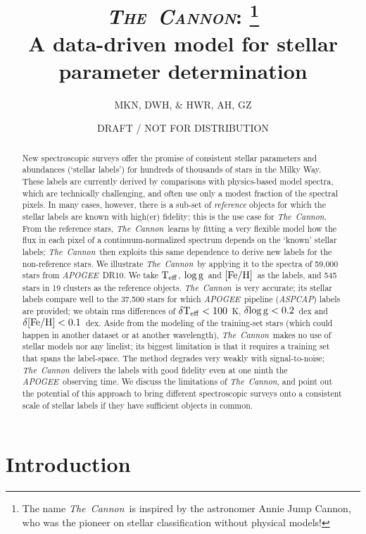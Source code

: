 \documentclass[12pt, preprint]{aastex}
\newcommand{\teff}{\mbox{$\rm T_{eff}$}}
\newcommand{\feh}{\mbox{$\rm [Fe/H]$}}
\newcommand{\logg}{\mbox{$\rm \log g$}}
\newcommand{\tc}{\textsl{The~Cannon}}
\newcommand{\apogee}{\textsl{APOGEE}}
\newcommand{\aspcap}{\textsl{ASPCAP}}
\begin{document}
\title{\textsc{\tc: \footnote{The name \tc\ is inspired by the astronomer Annie Jump Cannon,
who was the pioneer on stellar classification without physical models!}}\\ A data-driven model for stellar parameter determination}
\author{
  MKN,
  DWH,
  \&
  HWR,
  AH, GZ} 
\date{DRAFT / NOT FOR DISTRIBUTION}



\begin{abstract}%
New spectroscopic surveys offer the promise of consistent stellar
parameters and abundances (`stellar labels') for hundreds of thousands
of stars in the Milky Way. 
These labels are currently derived by comparisons with physics-based
model spectra, which are technically challenging, and often use only a
modest fraction of the spectral pixels. 
In many cases, however, there is a sub-set of \emph{reference}
objects for which the stellar labels are known with high(er)
fidelity; this is the use case for \tc.
From the reference stars, \tc\ learns by fitting a very flexible
model how the flux in each pixel of a continuum-normalized spectrum
depends on the `known' stellar labels; \tc\ then exploits this same
dependence to derive new labels for the non-reference stars.
We illustrate \tc\ by applying it to the spectra of 59,000 stars from
\apogee\ DR10. 
We take \teff, \logg\ and \feh\ as the labels, and 545 stars in 19
clusters as the reference objects. 
\tc\ is very accurate; its stellar labels compare well to the 37,500
stars for which \apogee\ pipeline (\aspcap) labels are provided; we
obtain rms differences of $\delta\teff< 100$~K, $\delta\logg< 0.2$~dex
and $\delta\feh< 0.1$~dex.
Aside from the modeling of the training-set stars (which could happen
in another dataset or at another wavelength), \tc\ makes no use of
stellar models nor any linelist; its biggest limitation is that it
requires a training set that spans the label-space. 
The method degrades very weakly with signal-to-noise; \tc\ delivers
the labels with good fidelity even at one ninth the
\apogee\ observing time. 
We discuss the limitations of \tc, and point out the potential of this
approach to bring different spectroscopic surveys onto a consistent
scale of stellar labels if they have sufficient objects in common.
\end{abstract}


\section{Introduction}
\end{document}
